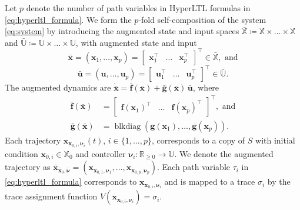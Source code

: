 \documentclass[letterpaper, 10 pt, conference]{ieeeconf}  %
\begin{document}
Let $p$ denote the number of path variables in HyperLTL formulas in \eqref{eq:hyperltl_formula}. We form the $p$-fold self-composition \cite{anand2024} of the system \eqref{eq:system} by introducing the augmented state and input spaces $\bar{\mathbb{X}} \coloneqq \mathbb{X} \times \dots \times \mathbb{X} $ and $\bar{\mathbb{U}} \coloneqq \mathbb{U} \times \dots \times \mathbb{U}$, with augmented state and input
\begin{equation*}
    \bar{\mathbf{x}} = (\mathbf{x}_1, \dots, \mathbf{x}_p) = \begin{bmatrix} \mathbf{x}_1^\top & \dots & \mathbf{x}_p^\top \end{bmatrix}^\top \in \bar{\mathbb{X}}, \text{ and}
\end{equation*}
\begin{equation*}
    \bar{\mathbf{u}} = (\mathbf{u}, \dots, \mathbf{u}_p) = \begin{bmatrix} \mathbf{u}_1^\top & \dots & \mathbf{u}_p^\top \end{bmatrix}^\top \in \bar{\mathbb{U}}.
\end{equation*}
The augmented dynamics are $\dot{\bar{\mathbf{x}}} = \bar{\mathbf{f}}(\bar{\mathbf{x}}) + \bar{\mathbf{g}}(\bar{\mathbf{x}}) \, \bar{\mathbf{u}}$, where 
\begin{equation} \label{eq:augmented_system}
    \begin{aligned}
        \bar{\mathbf{f}}(\bar{\mathbf{x}}) &= \begin{bmatrix}
        \mathbf{f}(\mathbf{x}_1)^\top & \dots & \mathbf{f}(\mathbf{x}_p)^\top \end{bmatrix}^\top, \text{ and} \\ 
        \bar{\mathbf{g}}(\bar{\mathbf{x}}) &= \operatorname{blkdiag} (\mathbf{g}(\mathbf{x}_1), \dots, \mathbf{g}(\mathbf{x}_p)).
    \end{aligned}
\end{equation}
Each trajectory $\mathbf{x}_{\mathbf{x}_{0, i}, \boldsymbol{\nu}_i}(t)$, $i \in \{1, \dots, p\}$, corresponds to a copy of $S$ with initial condition $\mathbf{x}_{0, i} \in \mathbb{X}_0$ and controller $\boldsymbol{\nu}_i: \mathbb{R}_{\ge 0} \rightarrow \mathbb{U}$. We denote the augmented trajectory as $\bar{\mathbf{x}}_{\bar{\mathbf{x}}_0, \bar{\boldsymbol{\nu}}} = (\mathbf{x}_{\mathbf{x}_{0, 1}, \boldsymbol{\nu}_1}, \dots, \mathbf{x}_{\mathbf{x}_{0, p}, \boldsymbol{\nu}_p})$. Each path variable $\tau_i$ in \eqref{eq:hyperltl_formula} corresponds to $\mathbf{x}_{\mathbf{x}_{0, i}, \boldsymbol{\nu}_i}$ and is mapped to a trace $\sigma_i$ by the trace assignment function $V(\mathbf{x}_{\mathbf{x}_{0, i}, \boldsymbol{\nu}_i}) = \sigma_i$.
\end{document}
